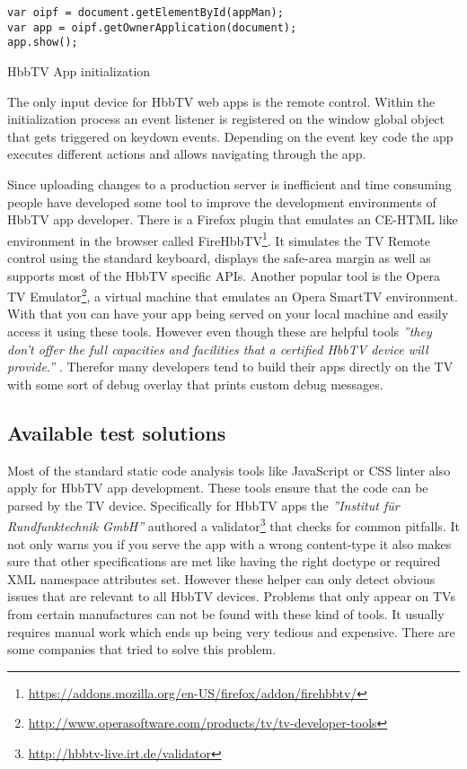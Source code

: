 \vspace{1cm}
\begin{listing}[H]
\begin{verbatim}
var oipf = document.getElementById(appMan);
var app = oipf.getOwnerApplication(document);
app.show();
\end{verbatim}
\caption{HbbTV App initialization}
\label{lst:loadApp}
\end{listing}
\vspace{0.5cm}

The only input device for HbbTV web apps is the remote control. Within the initialization process
an event listener is registered on the window global object that gets triggered on keydown events.
Depending on the event key code the app executes different actions and allows navigating through
the app.

Since uploading changes to a production server is inefficient and time consuming people have
developed some tool to improve the development environments of HbbTV app developer. There is a
Firefox plugin that emulates an CE-HTML like environment in the browser called FireHbbTV\footnote{\url{https://addons.mozilla.org/en-US/firefox/addon/firehbbtv/}}.
It simulates the TV Remote control using the standard keyboard, displays the safe-area margin as well
as supports most of the HbbTV specific APIs. Another popular tool is the Opera TV Emulator\footnote{\url{http://www.operasoftware.com/products/tv/tv-developer-tools}},
a virtual machine that emulates an Opera SmartTV environment. With that you can have your app being
served on your local machine and easily access it using these tools. However even though these are
helpful tools \textit{''they don't offer the full capacities and facilities that a certified HbbTV
device will provide.''} \cite{hbbtvenv}. Therefor many developers tend to build their apps directly
on the TV with some sort of debug overlay that prints custom debug messages.

\subsection{Available test solutions\label{sec:availabletestsolutions}}

Most of the standard static code analysis tools like JavaScript or CSS linter also apply for HbbTV app
development. These tools ensure that the code can be parsed by the TV device. Specifically for
HbbTV apps the \textit{''Institut für Rundfunktechnik GmbH''} authored a validator\footnote{\url{http://hbbtv-live.irt.de/validator}} that checks
for common pitfalls. It not only warns you if you serve the app with a wrong content-type
it also makes sure that other specifications are met like having the right doctype or required
XML namespace attributes set. However these helper can only detect obvious issues that are relevant
to all HbbTV devices. Problems that only appear on TVs from certain manufactures can not be found
with these kind of tools. It usually requires manual work which ends up being very tedious and
expensive. There are some companies that tried to solve this problem.

